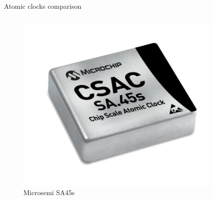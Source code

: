 \begin{frame}{Atomic clocks comparison}
\begin{columns}[c, onlytextwidth]
\begin{column}{0.25\textwidth}
            \begin{figure}[H]
                \centering
                \includegraphics[width=0.9\textwidth]{img/Microsemi-SA45s.png}
                \caption{Microsemi SA45s}
            \end{figure}

        \end{column}

    \end{columns}

    \begin{table}
        \centering


\end{table}
\end{frame}
